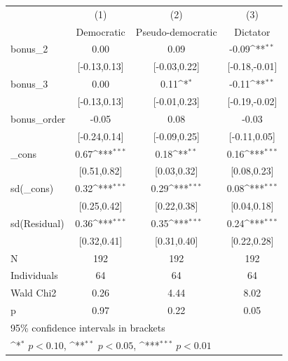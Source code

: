 {
\def\sym#1{\ifmmode^{#1}\else\(^{#1}\)\fi}
\begin{tabular}{l*{3}{c}}
\toprule
            &\multicolumn{1}{c}{(1)}        &\multicolumn{1}{c}{(2)}        &\multicolumn{1}{c}{(3)}        \\
            &\multicolumn{1}{c}{Democratic} &\multicolumn{1}{c}{Pseudo-democratic}&\multicolumn{1}{c}{Dictator}   \\
\midrule
bonus\_2     &                  0.00         &                  0.09         &                 -0.09\sym{**} \\
            &          [-0.13,0.13]         &          [-0.03,0.22]         &         [-0.18,-0.01]         \\
\addlinespace
bonus\_3     &                  0.00         &                  0.11\sym{*}  &                 -0.11\sym{**} \\
            &          [-0.13,0.13]         &          [-0.01,0.23]         &         [-0.19,-0.02]         \\
\addlinespace
bonus\_order &                 -0.05         &                  0.08         &                 -0.03         \\
            &          [-0.24,0.14]         &          [-0.09,0.25]         &          [-0.11,0.05]         \\
\addlinespace
\_cons      &                  0.67\sym{***}&                  0.18\sym{**} &                  0.16\sym{***}\\
            &           [0.51,0.82]         &           [0.03,0.32]         &           [0.08,0.23]         \\
\addlinespace
sd(\_cons)   &                  0.32\sym{***}&                  0.29\sym{***}&                  0.08\sym{***}\\
            &           [0.25,0.42]         &           [0.22,0.38]         &           [0.04,0.18]         \\
\addlinespace
sd(Residual)&                  0.36\sym{***}&                  0.35\sym{***}&                  0.24\sym{***}\\
            &           [0.32,0.41]         &           [0.31,0.40]         &           [0.22,0.28]         \\
\midrule
N           &                   192         &                   192         &                   192         \\
Individuals &                    64         &                    64         &                    64         \\
Wald Chi2   &                  0.26         &                  4.44         &                  8.02         \\
p           &                  0.97         &                  0.22         &                  0.05         \\
\bottomrule
\multicolumn{4}{l}{\footnotesize 95\% confidence intervals in brackets}\\
\multicolumn{4}{l}{\footnotesize \sym{*} \(p<0.10\), \sym{**} \(p<0.05\), \sym{***} \(p<0.01\)}\\
\end{tabular}
}
